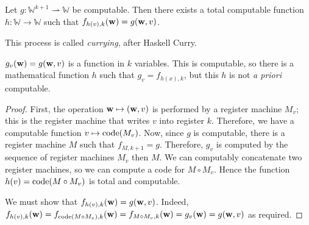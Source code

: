 \begin{theorem}
	Let \( g \colon \mathbb W^{k+1} \rightharpoonup \mathbb W \) be computable.
	Then there exists a total computable function \( h \colon \mathbb W \to \mathbb W \) such that \( f_{h(v),k}(\vb w) = g(\vb w, v) \).
\end{theorem}
This process is called \emph{currying}, after Haskell Curry.
\begin{remark}
	\( g_v(\vb w) = g(\vb w, v) \) is a function in \( k \) variables.
	This is computable, so there is a mathematical function \( h \) such that \( g_v = f_{h(x),k} \), but this \( h \) is not \emph{a priori} computable.
\end{remark}
\begin{proof}
	First, the operation \( \vb w \mapsto (\vb w, v) \) is performed by a register machine \( M_v \); this is the register machine that writes \( v \) into register \( k \).
	Therefore, we have a computable function \( v \mapsto \operatorname{code}(M_v) \).
	Now, since \( g \) is computable, there is a register machine \( M \) such that \( f_{M,k+1} = g \).
	Therefore, \( g_v \) is computed by the sequence of register machines \( M_v \) then \( M \).
	We can computably concatenate two register machines, so we can compute a code for \( M \circ M_v \).
	Hence the function \( h(v) = \operatorname{code}(M \circ M_v) \) is total and computable.

	We must show that \( f_{h(v),k}(\vb w) = g(\vb w, v) \).
	Indeed, \( f_{h(v),k}(\vb w) = f_{\operatorname{code}(M \circ M_v), k}(\vb w) = f_{M \circ M_v, k}(\vb w) = g_v(\vb w) = g(\vb w, v) \) as required.
\end{proof}

